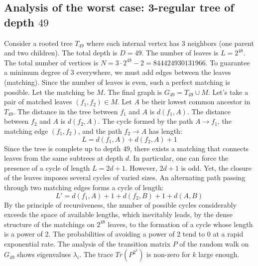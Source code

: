 \documentclass[12pt,a4paper]{article}
\begin{document}
\subsection{Analysis of the worst case: 3-regular tree of depth $49$}
Consider a rooted tree $T_{49}$ where each internal vertex has 3 neighbors (one parent and two children).
The total depth is $D = 49$.
The number of leaves is $L = 2^{48}$.
The total number of vertices is $N = 3 \cdot 2^{48} - 2 = 844424930131966$.
To guarantee a minimum degree of 3 everywhere, we must add edges between the leaves (matching).
Since the number of leaves is even, such a perfect matching is possible.
Let the matching be $M$. The final graph is $G_{49} = T_{49} \cup M$.
Let's take a pair of matched leaves $(f_1, f_2) \in M$.
Let $A$ be their lowest common ancestor in $T_{49}$.
The distance in the tree between $f_1$ and $A$ is $d(f_1, A)$.
The distance between $f_2$ and $A$ is $d(f_2, A)$.
The cycle formed by the path $A \to f_1$, the matching edge $(f_1, f_2)$, and the path $f_2 \to A$ has length:
$$ L = d(f_1, A) + d(f_2, A) + 1 $$
Since the tree is complete up to depth $49$, there exists a matching that connects leaves from the same subtrees at depth $d$.
In particular, one can force the presence of a cycle of length $L = 2d + 1$. However, $2d+1$ is odd.
Yet, the closure of the leaves imposes several cycles of varied sizes. An alternating path passing through two matching edges forms a cycle of length:
$$ L' = d(f_1, A) + 1 + d(f_2, B) + 1 + d(A, B) $$
By the principle of recursiveness, the number of possible cycles considerably exceeds the space of available lengths, which inevitably leads, by the dense structure of the matchings on $2^{48}$ leaves, to the formation of a cycle whose length is a power of 2. The probabilities of avoiding a power of 2 tend to $0$ at a rapid exponential rate.
The analysis of the transition matrix $P$ of the random walk on $G_{49}$ shows eigenvalues $\lambda_i$. The trace $Tr(P^{2^k})$ is non-zero for $k$ large enough.
\end{document}
